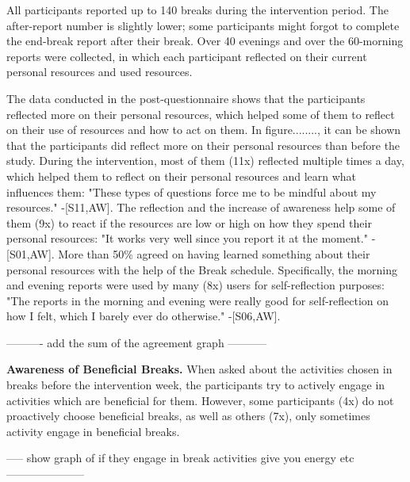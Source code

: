 \documentclass{hasel_thesis}
\begin{document}
All participants reported up to 140 breaks during the intervention period.  The after-report number is slightly lower; some participants might forgot to complete the end-break report after their break.  Over 40 evenings and over the 60-morning reports were collected, in which each participant reflected on their current personal resources and used resources.  

The data conducted in the post-questionnaire shows that the participants reflected more on their personal resources, which helped some of them to reflect on their use of resources and how to act on them.  In figure........, it can be shown that the participants did reflect more on their personal resources than before the study.  During the intervention, most of them (11x) reflected multiple times a day, which helped them to reflect on their personal resources and learn what influences them: "These types of questions force me to be mindful about my resources." -[S11,AW]. The reflection and the increase of awareness help some of them (9x) to react if the resources are low or high on how they spend their personal resources: "It works very well since you report it at the moment." - [S01,AW]. More than 50\% agreed on having learned something about their personal resources with the help of the Break schedule.  Specifically, the morning and evening reports were used by many (8x) users for self-reflection purposes: "The reports in the morning and evening were really good for self-reflection on how I felt, which I barely ever do otherwise." -[S06,AW]. 

---------- add the sum of the agreement graph -----------




\textbf{Awareness of Beneficial Breaks.} \label{beneficial_breaks}
When asked about the activities chosen in breaks before the intervention week, the participants try to actively engage in activities which are beneficial for them. However, some participants (4x) do not proactively choose beneficial breaks, as well as others (7x), only sometimes activity engage in beneficial breaks. 
 
----- show graph of if they engage in break activities give you energy etc ---------------------
\end{document}
